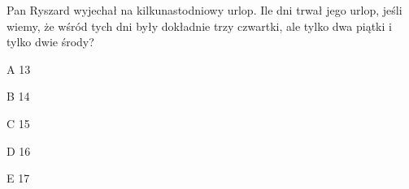 \begin{tresc}
Pan Ryszard wyjechał na kilkunastodniowy urlop. Ile dni trwał jego urlop, jeśli wiemy, że wśród tych dni były dokładnie trzy czwartki, ale tylko dwa piątki i tylko dwie środy?
\end{tresc}
\begin{wariant}{A} 13 \end{wariant}
\begin{wariant}{B} 14 \end{wariant}
\begin{wariant}{C} 15 \end{wariant}
\begin{wariant}{D} 16 \end{wariant}
\begin{wariant}{E} 17 \end{wariant}
